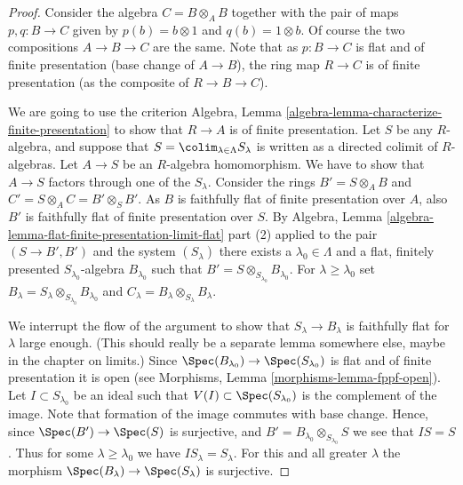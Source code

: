 \begin{proof}

Consider the algebra $C = B \otimes_A B$ together with the
pair of maps $p, q : B \to C$ given by $p(b) = b \otimes 1$
and $q(b) = 1 \otimes b$. Of course the two compositions
$A \to B \to C$ are the same. Note that as
$p : B \to C$ is flat and of finite presentation (base change of
$A \to B$), the ring map $R \to C$ is of finite presentation
(as the composite of $R \to B \to C$).

\medskip\noindent
We are going to use the criterion
Algebra, Lemma \ref{algebra-lemma-characterize-finite-presentation}
to show that $R \to A$ is of finite presentation.
Let $S$ be any $R$-algebra, and suppose that
$S = \colim_{\lambda \in \Lambda} S_\lambda$ is written
as a directed colimit of $R$-algebras.
Let $A \to S$ be an $R$-algebra homomorphism. We have to
show that $A \to S$ factors through one of the $S_\lambda$.
Consider the rings $B' = S \otimes_A B$ and
$C' = S \otimes_A C = B' \otimes_S B'$.
As $B$ is faithfully flat of finite presentation over $A$, also $B'$
is faithfully flat of finite presentation over $S$.
By Algebra, Lemma \ref{algebra-lemma-flat-finite-presentation-limit-flat}
part (2) applied to the pair $(S \to B', B')$ and the system $(S_\lambda)$
there exists a $\lambda_0 \in \Lambda$
and a flat, finitely presented $S_{\lambda_0}$-algebra
$B_{\lambda_0}$ such that $B' = S \otimes_{S_{\lambda_0}} B_{\lambda_0}$.
For $\lambda \geq \lambda_0$ set
$B_\lambda = S_\lambda \otimes_{S_{\lambda_0}} B_{\lambda_0}$ and
$C_\lambda = B_\lambda \otimes_{S_\lambda} B_\lambda$.

\medskip\noindent
We interrupt the flow of the argument to show that $S_\lambda \to B_\lambda$
is faithfully flat for $\lambda$ large enough. (This should really
be a separate lemma somewhere else, maybe in the chapter on limits.)
Since $\Spec(B_{\lambda_0}) \to \Spec(S_{\lambda_0})$ is
flat and of finite presentation it is open (see Morphisms,
Lemma \ref{morphisms-lemma-fppf-open}).
Let $I \subset S_{\lambda_0}$ be an ideal such that
$V(I) \subset \Spec(S_{\lambda_0})$ is the complement
of the image. Note that formation of the image commutes
with base change. Hence, since $\Spec(B') \to \Spec(S)$
is surjective, and $B' = B_{\lambda_0} \otimes_{S_{\lambda_0}} S$
we see that $IS = S$. Thus for some $\lambda \geq \lambda_0$ we
have $IS_{\lambda} = S_\lambda$. For this and all greater
$\lambda$ the morphism
$\Spec(B_\lambda) \to \Spec(S_\lambda)$ is surjective.


\end{proof}
